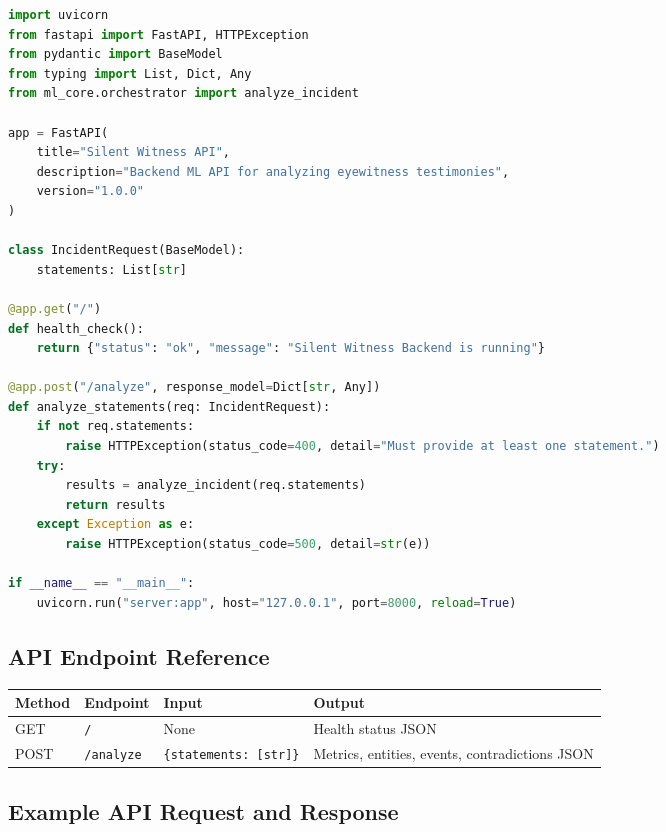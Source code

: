 \documentclass[12pt,a4paper]{report}
\begin{document}
\begin{lstlisting}[language=Python, caption={server.py --- Complete FastAPI application exposing the ML pipeline as a REST API.}]
import uvicorn
from fastapi import FastAPI, HTTPException
from pydantic import BaseModel
from typing import List, Dict, Any
from ml_core.orchestrator import analyze_incident

app = FastAPI(
    title="Silent Witness API",
    description="Backend ML API for analyzing eyewitness testimonies",
    version="1.0.0"
)

class IncidentRequest(BaseModel):
    statements: List[str]

@app.get("/")
def health_check():
    return {"status": "ok", "message": "Silent Witness Backend is running"}

@app.post("/analyze", response_model=Dict[str, Any])
def analyze_statements(req: IncidentRequest):
    if not req.statements:
        raise HTTPException(status_code=400, detail="Must provide at least one statement.")
    try:
        results = analyze_incident(req.statements)
        return results
    except Exception as e:
        raise HTTPException(status_code=500, detail=str(e))

if __name__ == "__main__":
    uvicorn.run("server:app", host="127.0.0.1", port=8000, reload=True)
\end{lstlisting}

\subsection{API Endpoint Reference}

\begin{center}
\begin{tabular}{p{2cm} p{3.5cm} p{3.5cm} p{5cm}}
\toprule
\textbf{Method} & \textbf{Endpoint} & \textbf{Input} & \textbf{Output} \\
\midrule
GET  & \texttt{/}        & None  & Health status JSON \\
POST & \texttt{/analyze} & \texttt{\{statements: [str]\}} & Metrics, entities, events, contradictions JSON \\
\bottomrule
\end{tabular}
\end{center}

\subsection{Example API Request and Response}
\end{document}
